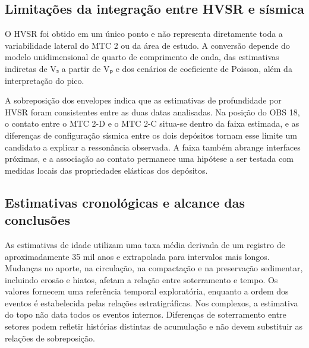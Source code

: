 \subsection{Limitações da integração entre HVSR e sísmica}\label{sec:6-10-5}

O HVSR foi obtido em um único ponto e não representa diretamente toda a variabilidade lateral do MTC 2 ou da área de estudo. A conversão depende do modelo unidimensional de quarto de comprimento de onda, das estimativas indiretas de Vₛ a partir de Vₚ e dos cenários de coeficiente de Poisson, além da interpretação do pico.

A sobreposição dos envelopes indica que as estimativas de profundidade por HVSR foram consistentes entre as duas datas analisadas. Na posição do OBS 18, o contato entre o MTC 2-D e o MTC 2-C situa-se dentro da faixa estimada, e as diferenças de configuração sísmica entre os dois depósitos tornam esse limite um candidato a explicar a ressonância observada. A faixa também abrange interfaces próximas, e a associação ao contato permanece uma hipótese a ser testada com medidas locais das propriedades elásticas dos depósitos.

\subsection{Estimativas cronológicas e alcance das conclusões}\label{sec:6-10-6}

As estimativas de idade utilizam uma taxa média derivada de um registro de aproximadamente 35 mil anos e extrapolada para intervalos mais longos. Mudanças no aporte, na circulação, na compactação e na preservação sedimentar, incluindo erosão e hiatos, afetam a relação entre soterramento e tempo. Os valores fornecem uma referência temporal exploratória, enquanto a ordem dos eventos é estabelecida pelas relações estratigráficas. Nos complexos, a estimativa do topo não data todos os eventos internos. Diferenças de soterramento entre setores podem refletir histórias distintas de acumulação e não devem substituir as relações de sobreposição.
